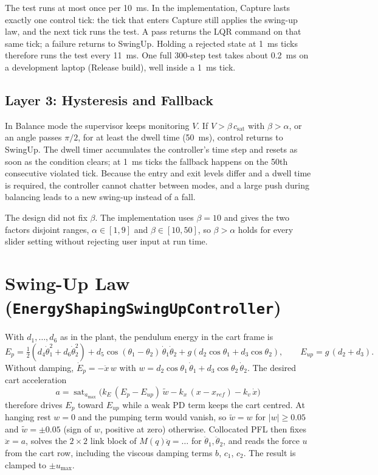 \documentclass[11pt,a4paper]{article}
\newcommand{\code}[1]{\texttt{#1}}
\newcommand{\csat}{c_{\mathrm{sat}}}
\newcommand{\umax}{u_{\max}}
\begin{document}
The test runs at most once per 10~ms. In the implementation, Capture lasts exactly one control
tick: the tick that enters Capture still applies the swing-up law, and the next tick runs the
test. A pass returns the LQR command on that same tick; a failure returns to SwingUp. Holding
a rejected state at 1~ms ticks therefore runs the test every 11~ms. One full 300-step test
takes about 0.2~ms on a development laptop (Release build), well inside a 1~ms tick.

\subsection{Layer 3: Hysteresis and Fallback}
In Balance mode the supervisor keeps monitoring $V$. If $V > \beta\,\csat$ with
$\beta > \alpha$, or an angle passes $\pi/2$, for at least the dwell time (50~ms), control
returns to SwingUp. The dwell timer accumulates the controller's time step and resets as soon
as the condition clears; at 1~ms ticks the fallback happens on the 50th consecutive violated
tick. Because the entry and exit levels differ and a dwell time is required, the controller
cannot chatter between modes, and a large push during balancing leads to a new swing-up
instead of a fall.

The design did not fix $\beta$. The implementation uses $\beta = 10$ and gives the two factors
disjoint ranges, $\alpha \in [1, 9]$ and $\beta \in [10, 50]$, so $\beta > \alpha$ holds for
every slider setting without rejecting user input at run time.

\section{Swing-Up Law (\code{EnergyShapingSwingUpController})}\label{sec:swingup}
With $d_1,\dots,d_6$ as in the plant, the pendulum energy in the cart frame is
\[
E_p = \tfrac12\left(d_4\dot\theta_1^2 + d_6\dot\theta_2^2\right)
 + d_5\cos(\theta_1-\theta_2)\,\dot\theta_1\dot\theta_2
 + g\left(d_2\cos\theta_1 + d_3\cos\theta_2\right),
\qquad E_{up} = g\,(d_2 + d_3).
\]
Without damping, $\dot E_p = -\ddot x\, w$ with
$w = d_2\cos\theta_1\,\dot\theta_1 + d_3\cos\theta_2\,\dot\theta_2$. The desired cart acceleration
\[
a = \operatorname{sat}_{a_{\max}}\!\Big(k_E\,(E_p - E_{up})\,\tilde w
 - k_x\,(x - x_{ref}) - k_v\,\dot x\Big)
\]
therefore drives $E_p$ toward $E_{up}$ while a weak PD term keeps the cart centred. At hanging
rest $w = 0$ and the pumping term would vanish, so $\tilde w = w$ for $|w| \ge 0.05$ and
$\tilde w = \pm 0.05$ (sign of $w$, positive at zero) otherwise. Collocated PFL then fixes
$\ddot x = a$, solves the $2\times 2$ link block of $M(q)\ddot q = \ldots$ for
$\ddot\theta_1, \ddot\theta_2$, and reads the force $u$ from the cart row, including the viscous
damping terms $b$, $c_1$, $c_2$. The result is clamped to $\pm\umax$.
\end{document}
